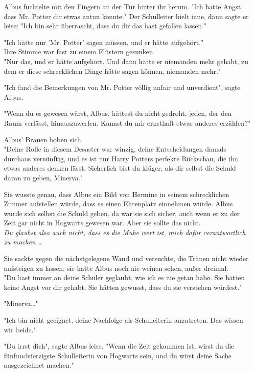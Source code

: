 {Albus fuchtelte mit den Fingern an der Tür hinter ihr herum. "Ich hatte Angst, dass Mr. Potter dir etwas antun könnte." Der Schulleiter hielt inne, dann sagte er leise: "Ich bin sehr überrascht, dass du dir das hast gefallen lassen."

"Ich hätte nur 'Mr. Potter' sagen müssen, und er hätte aufgehört."\\ Ihre Stimme war fast zu einem Flüstern gesunken.\\ "Nur das, und er hätte aufgehört. Und dann hätte er niemanden mehr gehabt, zu dem er diese schrecklichen Dinge hätte sagen können, niemanden mehr."

"Ich fand die Bemerkungen von Mr. Potter völlig unfair und unverdient", sagte Albus.

"Wenn du es gewesen wärst, Albus, hättest du nicht gedroht, jeden, der den Raum verlässt, hinauszuwerfen. Kannst du mir ernsthaft etwas anderes erzählen?"

Albus' Brauen hoben sich.\\ "Deine Rolle in diesem Desaster war winzig, deine Entscheidungen damals durchaus vernünftig, und es ist nur Harry Potters perfekte Rückschau, die ihn etwas anderes denken lässt. Sicherlich bist du klüger, als dir selbst die Schuld daran zu geben, Minerva."

Sie wusste genau, dass Albus ein Bild von Hermine in seinem schrecklichen Zimmer aufstellen würde, dass es einen Ehrenplatz einnehmen würde. Albus würde sich selbst die Schuld geben, da war sie sich sicher, auch wenn er zu der Zeit gar nicht in Hogwarts gewesen war. Aber sie sollte das nicht.\\ \emph{Du glaubst also auch nicht, dass es die Mühe wert ist, mich dafür verantwortlich zu machen …}

Sie sackte gegen die nächstgelegene Wand und versuchte, die Tränen nicht wieder aufsteigen zu lassen; sie hatte Albus noch nie weinen sehen, außer dreimal.\\ "Du hast immer an deine Schüler geglaubt, wie ich es nie getan habe. Sie hätten keine Angst vor dir gehabt. Sie hätten gewusst, dass du sie verstehen würdest."

"Minerva…"

"Ich bin nicht geeignet, deine Nachfolge als Schulleiterin anzutreten. Das wissen wir beide."

"Du irrst dich", sagte Albus leise. "Wenn die Zeit gekommen ist, wirst du die fünfundvierzigste Schulleiterin von Hogwarts sein, und du wirst deine Sache ausgezeichnet machen."

}
